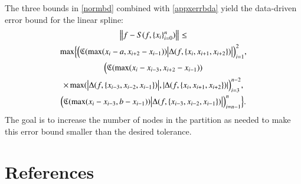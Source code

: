 \documentclass[review]{elsarticle}
\newcommand{\datasites}{\{x_i\}_{i=0}^n}
\begin{document}
The three bounds in \eqref{normbd} combined with \eqref{appxerrbda} yield the data-driven error bound for the linear spline:
\begin{multline} \label{appxerrbdb}
\norm{f - S(f,\datasites)} \le \\
\max \Bigl \{ \Bigl(\fC(\max(x_i-a,x_{i+2}-x_{i-1}))\bigabs{\Delta(f,\{x_{i}, x_{i+1}, x_{i+2}\})} \Bigr)_{i=1}^2, \\
\Bigl( \fC(\max(x_i-x_{i-3},x_{i+2}-x_{i-1}))\\
 \times \max(\bigabs{\Delta(f,\{x_{i-3}, x_{i-2}, x_{i-1}\})},\abs{\Delta(f,\{x_{i}, x_{i+1}, x_{i+2}\})} \Bigr)_{i=3}^{n-2}, \\
 \Bigl(\fC(\max(x_i-x_{i-3},b-x_{i-1}))\bigabs{\Delta(f,\{x_{i-3}, x_{i-2}, x_{i-1}\})} \Bigr)_{i=n-1}^n \Bigr\}.
\end{multline}
The goal is to increase the number of nodes in the partition as needed to make this error bound smaller than the desired tolerance.


\section*{References}


\end{document}

